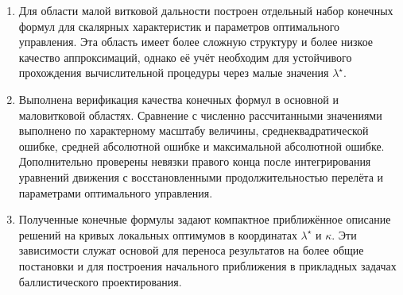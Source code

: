 \begin{enumerate}
	\item Для области малой витковой дальности построен отдельный набор конечных формул для скалярных характеристик и параметров оптимального управления. Эта область имеет более сложную структуру и более низкое качество аппроксимаций, однако её учёт необходим для устойчивого прохождения вычислительной процедуры через малые значения $\lambda^\star$.
	
	\item Выполнена верификация качества конечных формул в основной и маловитковой областях. Сравнение с численно рассчитанными значениями выполнено по характерному масштабу величины, среднеквадратической ошибке, средней абсолютной ошибке и максимальной абсолютной ошибке. Дополнительно проверены невязки правого конца после интегрирования уравнений движения с восстановленными продолжительностью перелёта и параметрами оптимального управления.
	
	\item Полученные конечные формулы задают компактное приближённое описание решений на кривых локальных оптимумов в координатах $\lambda^\star$ и $\kappa$. Эти зависимости служат основой для переноса результатов на более общие постановки и для построения начального приближения в прикладных задачах баллистического проектирования.
\end{enumerate}